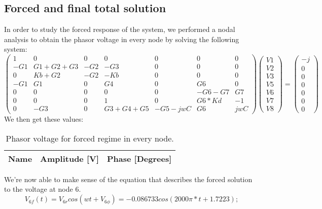 \subsection{Forced and final total solution}
In order to study the forced response of the system, we performed a nodal analysis to obtain the phasor voltage in every node by solving the following system:
\begin{equation}
\begin{pmatrix}
1 & 0 & 0 & 0 & 0 & 0 & 0\\
-G1 & G1+G2+G3 & -G2 & -G3 & 0 & 0 & 0\\
0 & Kb+G2 & -G2 & -Kb & 0 & 0 & 0\\
-G1 & G1 & 0 & G4 & 0 & G6 & 0\\
0 & 0 & 0 & 0 & 0 & -G6-G7 & G7\\
0 & 0 & 0 & 1 & 0 & G6*Kd & -1\\
0 & -G3 & 0 & G3+G4+G5 & -G5-jwC & G6 & jwC
\end{pmatrix}
\begin{pmatrix}
V1\\
V2\\
V3\\
V5\\
V6\\
V7\\
V8
\end{pmatrix}
=
\begin{pmatrix}
-j\\
0\\
0\\
0\\
0\\
0\\
0
\end{pmatrix}
\end{equation}
We then get these values:
\begin{table}[h]
  \centering
  \begin{tabular}{|l|r|r|}
    \hline    
    {\bf Name} & {\bf Amplitude [V]} & {\bf Phase [Degrees]}\\ \hline
     
  \end{tabular}
  \caption{Phasor voltage for forced regime in every node.}
  \label{tab:phasor}
\end{table} \par
We're now able to make sense of the equation that describes the forced solution to the voltage at node 6.
\begin{equation}
V_{6f}(t)=V_{6r}cos(wt+V_{6\phi})=-0.086733cos(2000\pi*t+1.7223);
\end{equation}
